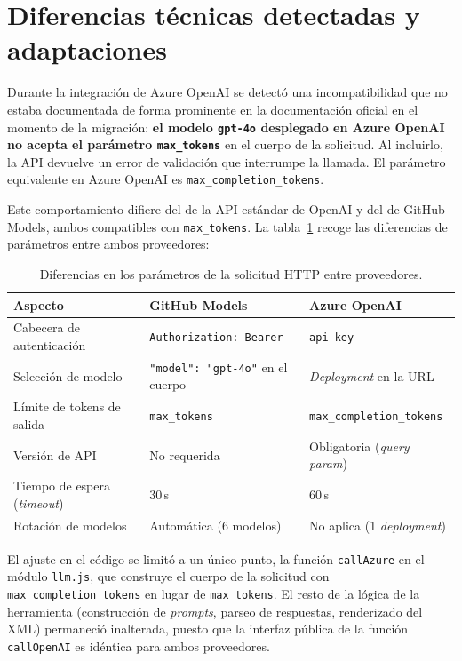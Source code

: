 \section{Diferencias técnicas detectadas y adaptaciones}
\label{sec:anx2-diferencias}

Durante la integración de Azure OpenAI se detectó una incompatibilidad que no estaba documentada de forma prominente en la documentación oficial en el momento de la migración: \textbf{el modelo \texttt{gpt-4o} desplegado en Azure OpenAI no acepta el parámetro \texttt{max\_tokens}} en el cuerpo de la solicitud. Al incluirlo, la API devuelve un error de validación que interrumpe la llamada. El parámetro equivalente en Azure OpenAI es \texttt{max\_completion\_tokens}.

Este comportamiento difiere del de la API estándar de OpenAI y del de GitHub Models, ambos compatibles con \texttt{max\_tokens}. La tabla~\ref{tab:parametrosAPI} recoge las diferencias de parámetros entre ambos proveedores:

\begin{table}[H]
\centering
\caption{Diferencias en los parámetros de la solicitud HTTP entre proveedores.}
\label{tab:parametrosAPI}
\begin{tabular}{@{} p{4.5cm} p{4.5cm} p{4.5cm} @{}}
\hline
\rule{0pt}{10pt}\textbf{Aspecto} & \textbf{GitHub Models} & \textbf{Azure OpenAI} \\
\hline
\rule{0pt}{10pt}Cabecera de autenticación & \texttt{Authorization: Bearer} & \texttt{api-key} \\[4pt]
Selección de modelo & \texttt{"model": "gpt-4o"} en el cuerpo & \textit{Deployment} en la URL \\[4pt]
Límite de tokens de salida & \texttt{max\_tokens} & \texttt{max\_completion\_tokens} \\[4pt]
Versión de API & No requerida & Obligatoria (\textit{query param}) \\[4pt]
Tiempo de espera (\textit{timeout}) & 30\,s & 60\,s \\[4pt]
Rotación de modelos & Automática (6 modelos) & No aplica (1 \textit{deployment}) \\[4pt]
\hline
\end{tabular}
\end{table}

El ajuste en el código se limitó a un único punto, la función \texttt{callAzure} en el módulo \texttt{llm.js}, que construye el cuerpo de la solicitud con \texttt{max\_completion\_tokens} en lugar de \texttt{max\_tokens}. El resto de la lógica de la herramienta (construcción de \textit{prompts}, parseo de respuestas, renderizado del XML) permaneció inalterada, puesto que la interfaz pública de la función \texttt{callOpenAI} es idéntica para ambos proveedores.

